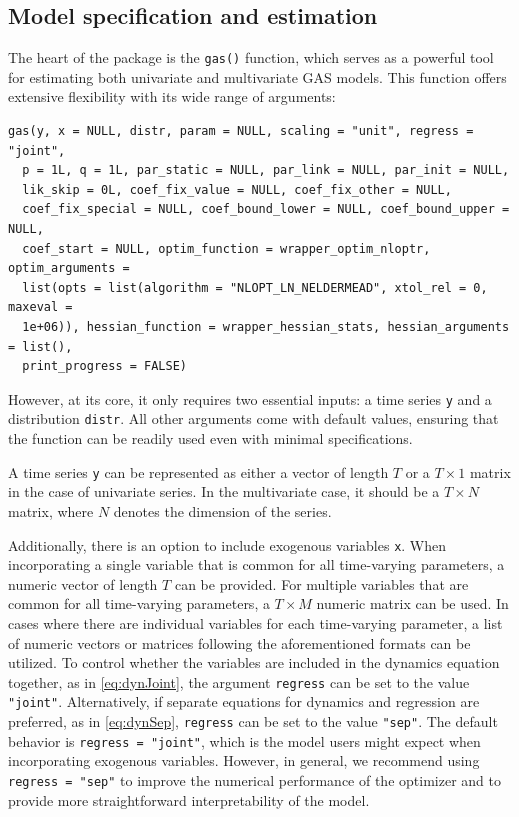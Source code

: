 \subsection{Model specification and estimation}\label{model-specification-and-estimation}

The heart of the  package is the \texttt{gas()} function, which serves as a powerful tool for estimating both univariate and multivariate GAS models. This function offers extensive flexibility with its wide range of arguments:

\begin{verbatim}
gas(y, x = NULL, distr, param = NULL, scaling = "unit", regress = "joint",
  p = 1L, q = 1L, par_static = NULL, par_link = NULL, par_init = NULL,
  lik_skip = 0L, coef_fix_value = NULL, coef_fix_other = NULL,
  coef_fix_special = NULL, coef_bound_lower = NULL, coef_bound_upper = NULL,
  coef_start = NULL, optim_function = wrapper_optim_nloptr, optim_arguments =
  list(opts = list(algorithm = "NLOPT_LN_NELDERMEAD", xtol_rel = 0, maxeval =
  1e+06)), hessian_function = wrapper_hessian_stats, hessian_arguments = list(),
  print_progress = FALSE)
\end{verbatim}

However, at its core, it only requires two essential inputs: a time series \texttt{y} and a distribution \texttt{distr}. All other arguments come with default values, ensuring that the function can be readily used even with minimal specifications.

A time series \texttt{y} can be represented as either a vector of length \(T\) or a \(T \times 1\) matrix in the case of univariate series. In the multivariate case, it should be a \(T \times N\) matrix, where \(N\) denotes the dimension of the series.

Additionally, there is an option to include exogenous variables \texttt{x}. When incorporating a single variable that is common for all time-varying parameters, a numeric vector of length \(T\) can be provided. For multiple variables that are common for all time-varying parameters, a \(T \times M\) numeric matrix can be used. In cases where there are individual variables for each time-varying parameter, a list of numeric vectors or matrices following the aforementioned formats can be utilized. To control whether the variables are included in the dynamics equation together, as in \eqref{eq:dynJoint}, the argument \texttt{regress} can be set to the value \texttt{"joint"}. Alternatively, if separate equations for dynamics and regression are preferred, as in \eqref{eq:dynSep}, \texttt{regress} can be set to the value \texttt{"sep"}. The default behavior is \texttt{regress\ =\ "joint"}, which is the model users might expect when incorporating exogenous variables. However, in general, we recommend using \texttt{regress\ =\ "sep"} to improve the numerical performance of the optimizer and to provide more straightforward interpretability of the model.

